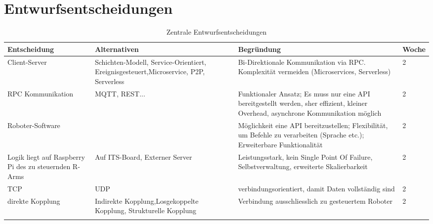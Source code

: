 \chapter{Entwurfsentscheidungen}



\begin{table}[h!]
	\centering
	\begin{tabular}{p{3cm}|p{4cm}| p{5.5cm} | p{1.5cm}|}
		\hline
		\textbf{Entscheidung} & \textbf{Alternativen} & \textbf{Begründung} & \textbf{Woche}\\
		\hline
		Client-Server  & Schichten-Modell, Service-Orientiert, Ereignisgesteuert,Microservice, P2P, Serverless  & Bi-Direktionale Kommunikation via RPC. Komplexität vermeiden (Microservices, Serverless) &  2\\
		\hline
		RPC Kommunikation & MQTT, REST... & Funktionaler Ansatz; Es muss nur eine API bereitgestellt werden, sher effizient, kleiner Overhead, asynchrone Kommunikation möglich & 2 \\
		\hline
		Roboter-Software &  & Möglichkeit eine API bereitzustellen; Flexibilität, um Befehle zu verarbeiten (Sprache etc.); Erweiterbare Funktionalität & 2 \\
		\hline
		Logik liegt auf Raspberry Pi des zu steuernden R-Arms& Auf ITS-Board, Externer Server & Leistungsstark, kein Single Point Of Failure, Selbstverwaltung, erweiterte Skalierbarkeit & 2 \\
		\hline
		TCP & UDP  & verbindungsorientiert, damit Daten vollständig sind& 2\\
		\hline
		direkte Kopplung & Indirekte Kopplung,Losgekoppelte Kopplung, Strukturelle Kopplung  & Verbindung ausschliesslich zu gesteuertem Roboter & 2 \\
		\hline
		&  & & \\
		\hline
	\end{tabular}
	\caption{Zentrale Entwurfsentscheidungen}
	\label{tab:entwurfsentschiedungen}
\end{table}
